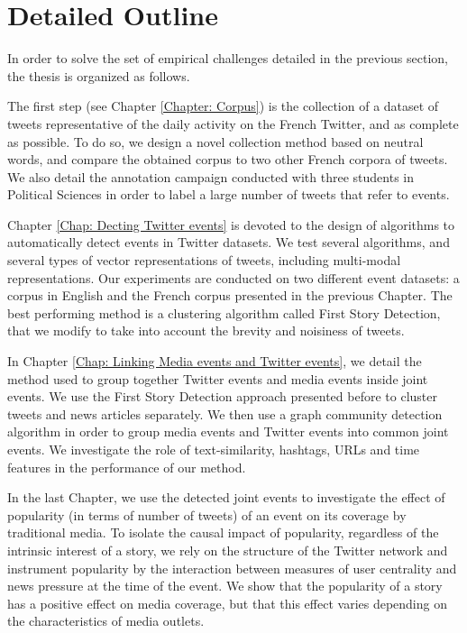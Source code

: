 \section{Detailed Outline}
In order to solve the set of empirical challenges detailed in the previous section, the thesis is organized as follows.

The first step (see Chapter \ref{Chapter: Corpus}) is the collection of a dataset of tweets representative of the daily activity on the French Twitter, and as complete as possible. To do so, we design a novel collection method based on neutral words, and compare the obtained corpus to two other French corpora 
of tweets. We also detail the annotation campaign conducted with three students in Political Sciences in order to label a large number of tweets that refer to events.

Chapter \ref{Chap: Decting Twitter events} is devoted to the design of algorithms to automatically detect events in Twitter datasets. We test several algorithms, and several types of vector representations of tweets, including multi-modal representations. Our experiments are conducted on two different event datasets: a corpus in English \citep{mcminn_building_2013} and the French corpus presented in the previous Chapter. The best performing method is a clustering algorithm called First Story Detection, that we modify to take into account the brevity and noisiness of tweets.

In Chapter \ref{Chap: Linking Media events and Twitter events}, we detail the method used to group together Twitter events and media events inside joint events. We use the First Story Detection approach presented before to cluster tweets and news articles separately. We then use a graph community detection algorithm in order to group media events and Twitter events into common joint events. We investigate the role of text-similarity, hashtags, URLs and time features in the performance of our method.

In the last Chapter, we use the detected joint events to investigate the effect of popularity (in terms of number of tweets) of an event on its coverage by traditional media. To isolate the causal impact of popularity, regardless of the intrinsic interest of a story, we rely on the structure of the Twitter network and instrument popularity by the interaction
between measures of user centrality and news pressure at the time of the event. We show that the popularity of a story has a positive effect on media coverage, but that this effect varies
depending on the characteristics of media outlets.